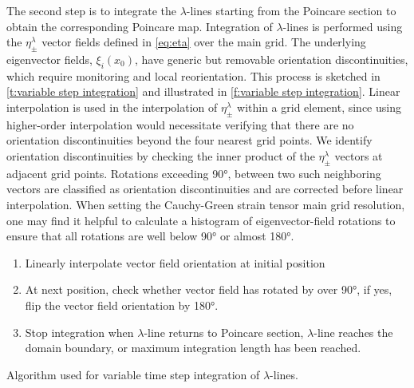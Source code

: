 \documentclass{elsarticle}
\begin{document}
The second step is to integrate the $\lambda$-lines  starting from the Poincare section to obtain the corresponding Poincare map. Integration of $\lambda$-lines is performed using the $\eta_\pm^\lambda$ vector fields defined in \cref{eq:eta} over the main grid. The underlying eigenvector fields, $\xi_i(x_0)$, have generic but removable orientation discontinuities, which require monitoring and local reorientation. This process is sketched in \cref{t:variable step integration} and illustrated in \cref{f:variable step integration}. Linear interpolation is used in the interpolation of $\eta_\pm^\lambda$ within a grid element, since using higher-order interpolation would necessitate verifying that there are no orientation discontinuities beyond the four nearest grid points. We identify orientation discontinuities by checking the inner product of the $\eta_\pm^\lambda$ vectors at adjacent grid points. Rotations exceeding 90°, between two such neighboring vectors are classified as orientation discontinuities and are corrected before linear interpolation. When setting the Cauchy-Green strain tensor main grid resolution, one may find it helpful to calculate a histogram of eigenvector-field rotations to ensure that all rotations are well below 90° or almost 180°.

\begin{table}
\begin{enumerate}
\item Linearly interpolate vector field orientation at initial position
\item At next position, check whether vector field has rotated by over 90°, if yes, flip the vector field orientation by 180°.
\item Stop integration when $\lambda$-line returns to Poincare section, $\lambda$-line reaches the domain boundary, or maximum integration length has been reached.
\end{enumerate}
\caption{Algorithm used for variable time step integration of $\lambda$-lines.}
\label{t:variable step integration}
\end{table}
\end{document}
